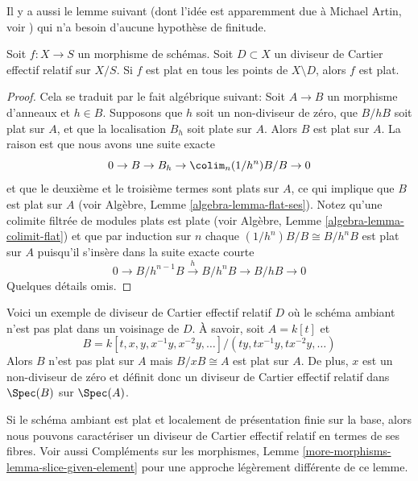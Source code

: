 \noindent
Il y a aussi le lemme suivant (dont l'idée est apparemment due à Michael Artin,
voir  \cite{Nobile}) qui n'a besoin d'aucune hypothèse de finitude.

\begin{lemma}
\label{lemma-michael-artin}
Soit  $f : X \to S$  un morphisme de schémas. Soit  $D \subset X$  un diviseur de
Cartier effectif relatif sur  $X/S$. Si  $f$  est plat en tous les
points de  $X \setminus D$, alors  $f$  est plat.
\end{lemma}

\begin{proof}
Cela se traduit par le fait algébrique suivant: Soit  $A \to B$  un morphisme
d’anneaux et  $h \in B$. Supposons que  $h$  soit un non-diviseur de
zéro, que  $B/hB$  soit plat sur  $A$, et que la localisation
 $B_h$  soit plate sur  $A$. Alors  $B$  est plat sur
 $A$. La raison est que nous avons une suite exacte
$$
0 \to B \to B_h \to \colim_n (1/h^n)B/B \to 0
$$
et que le deuxième et le troisième termes sont plats sur  $A$, ce qui
implique que  $B$  est plat sur  $A$  (voir Algèbre, Lemme
 \ref{algebra-lemma-flat-ses}). Notez qu'une colimite filtrée de modules plats est plate (voir
Algèbre, Lemme  \ref{algebra-lemma-colimit-flat}) et que par induction sur  $n$  chaque
 $(1/h^n)B/B \cong B/h^nB$  est plat sur  $A$  puisqu'il s'insère dans la suite exacte
courte
$$
0 \to B/h^{n - 1}B \xrightarrow{h} B/h^nB \to B/hB \to 0
$$
Quelques détails omis.
\end{proof}

\begin{example}
\label{example-relative-cartier-ambient-space-not-flat}
Voici un exemple de diviseur de Cartier effectif relatif  $D$  où le schéma
ambiant n'est pas plat dans un voisinage de  $D$. À savoir, soit
 $A = k[t]$  et
$$
B = k[t, x, y, x^{-1}y, x^{-2}y, \ldots]/(ty, tx^{-1}y, tx^{-2}y, \ldots)
$$
Alors  $B$  n'est pas plat sur  $A$  mais  $B/xB \cong A$  est plat sur
 $A$. De plus,  $x$  est un non-diviseur de zéro et définit donc un
diviseur de Cartier effectif relatif dans  $\Spec(B)$  sur  $\Spec(A)$.
\end{example}

\noindent
Si le schéma ambiant est plat et localement de présentation finie sur la base,
alors nous pouvons caractériser un diviseur de Cartier effectif relatif en termes
de ses fibres. Voir aussi Compléments sur les morphismes, Lemme  \ref{more-morphisms-lemma-slice-given-element}  pour une approche
légèrement différente de ce lemme.

